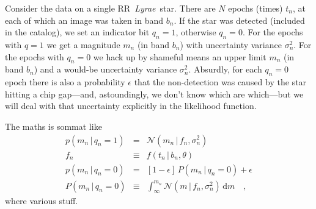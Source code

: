 \documentclass[12pt]{article}
\newcommand{\rrl}{RR~\textit{Lyrae}}
\newcommand{\given}{\,|\,}
\newcommand{\dd}{\mathrm{d}}
\newcommand{\normal}{\mathcal{N}}
\begin{document}
Consider the data on a single \rrl\ star.  There are $N$ epochs
(times) $t_n$, at each of which an image was taken in band $b_n$.  If
the star was detected (included in the catalog), we set an indicator
bit $q_n=1$, otherwise $q_n=0$.  For the epochs with $q=1$ we get a
magnitude $m_n$ (in band $b_n$) with uncertainty variance
$\sigma^2_n$.  For the epochs with $q_n=0$ we hack up by shameful
means an upper limit $m_n$ (in band $b_n$) and a would-be uncertainty
variance $\sigma^2_n$.  Absurdly, for each $q_n=0$ epoch there is also
a probability $\epsilon$ that the non-detection was caused by the star
hitting a chip gap---and, astoundingly, we don't know which are
which---but we will deal with that uncertainty explicitly in the
likelihood function.

The maths is sommat like
\begin{eqnarray}
p(m_n \given q_n=1) &=& \normal(m_n \given f_n, \sigma^2_n)
\\
f_n &\equiv& f(t_n \given b_n, \theta)
\\
p(m_n \given q_n=0) &=& [1-\epsilon]\,P(m_n \given q_n=0) + \epsilon
\\
P(m_n \given q_n=0) &\equiv& \int_{\infty}^{m_n} \normal(m \given f_n, \sigma^2_n)\,\dd m
\quad,
\end{eqnarray}
where various stuff.
\end{document}
